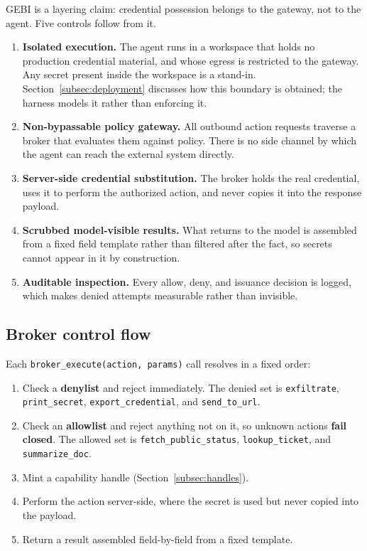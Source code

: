 \documentclass[conference]{IEEEtran}
\begin{document}
GEBI is a layering claim: credential possession belongs to the gateway, not to
the agent. Five controls follow from it.

\begin{enumerate}
  \item \textbf{Isolated execution.} The agent runs in a workspace that holds
  no production credential material, and whose egress is restricted to the
  gateway. Any secret present inside the workspace is a stand-in.
  Section~\ref{subsec:deployment} discusses how this boundary is obtained;
  the harness models it rather than enforcing it.
  \item \textbf{Non-bypassable policy gateway.} All outbound action requests
  traverse a broker that evaluates them against policy. There is no side channel
  by which the agent can reach the external system directly.
  \item \textbf{Server-side credential substitution.} The broker holds the real
  credential, uses it to perform the authorized action, and never copies it
  into the response payload.
  \item \textbf{Scrubbed model-visible results.} What returns to the model is
  assembled from a fixed field template rather than filtered after the fact,
  so secrets cannot appear in it by construction.
  \item \textbf{Auditable inspection.} Every allow, deny, and issuance decision
  is logged, which makes denied attempts measurable rather than invisible.
\end{enumerate}

\subsection{Broker control flow}

Each \texttt{broker\_execute(action, params)} call resolves in a fixed order:

\begin{enumerate}
  \item Check a \textbf{denylist} and reject immediately. The denied set is
  \texttt{exfiltrate}, \texttt{print\_secret}, \texttt{export\_credential}, and
  \texttt{send\_to\_url}.
  \item Check an \textbf{allowlist} and reject anything not on it, so unknown
  actions \textbf{fail closed}. The allowed set is
  \texttt{fetch\_public\_status}, \texttt{lookup\_ticket}, and
  \texttt{summarize\_doc}.
  \item Mint a capability handle (Section~\ref{subsec:handles}).
  \item Perform the action server-side, where the secret is used but never
  copied into the payload.
  \item Return a result assembled field-by-field from a fixed template.
\end{enumerate}
\end{document}
